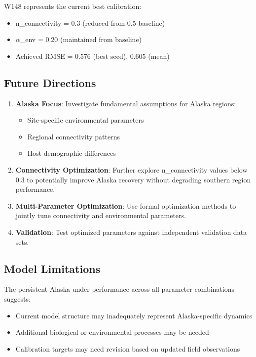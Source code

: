 \documentclass[11pt]{article}
\begin{document}
W148 represents the current best calibration:
\begin{itemize}
\item n\_connectivity = 0.3 (reduced from 0.5 baseline)
\item $\alpha$\_env = 0.20 (maintained from baseline)
\item Achieved RMSE = 0.576 (best seed), 0.605 (mean)
\end{itemize}

\subsection{Future Directions}

\begin{enumerate}
\item \textbf{Alaska Focus}: Investigate fundamental assumptions for Alaska regions:
   \begin{itemize}
   \item Site-specific environmental parameters
   \item Regional connectivity patterns
   \item Host demographic differences
   \end{itemize}

\item \textbf{Connectivity Optimization}: Further explore n\_connectivity values below 0.3 to potentially improve Alaska recovery without degrading southern region performance.

\item \textbf{Multi-Parameter Optimization}: Use formal optimization methods to jointly tune connectivity and environmental parameters.

\item \textbf{Validation}: Test optimized parameters against independent validation data sets.
\end{enumerate}

\subsection{Model Limitations}

The persistent Alaska under-performance across all parameter combinations suggests:
\begin{itemize}
\item Current model structure may inadequately represent Alaska-specific dynamics
\item Additional biological or environmental processes may be needed
\item Calibration targets may need revision based on updated field observations
\end{itemize}
\end{document}
